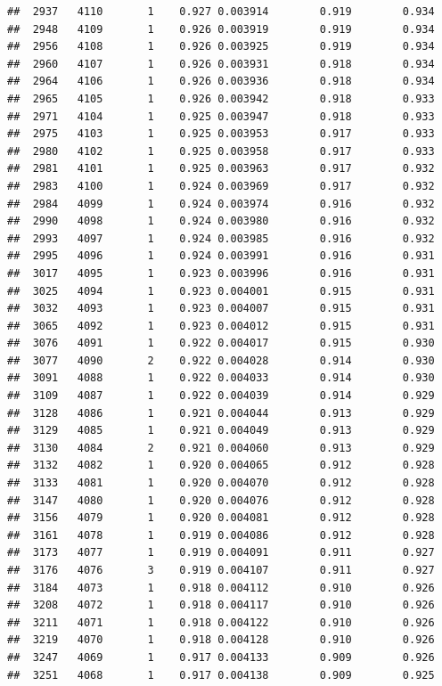 \documentclass[
]{book}
\begin{document}
\begin{verbatim}
##  2937   4110       1    0.927 0.003914        0.919        0.934
##  2948   4109       1    0.926 0.003919        0.919        0.934
##  2956   4108       1    0.926 0.003925        0.919        0.934
##  2960   4107       1    0.926 0.003931        0.918        0.934
##  2964   4106       1    0.926 0.003936        0.918        0.934
##  2965   4105       1    0.926 0.003942        0.918        0.933
##  2971   4104       1    0.925 0.003947        0.918        0.933
##  2975   4103       1    0.925 0.003953        0.917        0.933
##  2980   4102       1    0.925 0.003958        0.917        0.933
##  2981   4101       1    0.925 0.003963        0.917        0.932
##  2983   4100       1    0.924 0.003969        0.917        0.932
##  2984   4099       1    0.924 0.003974        0.916        0.932
##  2990   4098       1    0.924 0.003980        0.916        0.932
##  2993   4097       1    0.924 0.003985        0.916        0.932
##  2995   4096       1    0.924 0.003991        0.916        0.931
##  3017   4095       1    0.923 0.003996        0.916        0.931
##  3025   4094       1    0.923 0.004001        0.915        0.931
##  3032   4093       1    0.923 0.004007        0.915        0.931
##  3065   4092       1    0.923 0.004012        0.915        0.931
##  3076   4091       1    0.922 0.004017        0.915        0.930
##  3077   4090       2    0.922 0.004028        0.914        0.930
##  3091   4088       1    0.922 0.004033        0.914        0.930
##  3109   4087       1    0.922 0.004039        0.914        0.929
##  3128   4086       1    0.921 0.004044        0.913        0.929
##  3129   4085       1    0.921 0.004049        0.913        0.929
##  3130   4084       2    0.921 0.004060        0.913        0.929
##  3132   4082       1    0.920 0.004065        0.912        0.928
##  3133   4081       1    0.920 0.004070        0.912        0.928
##  3147   4080       1    0.920 0.004076        0.912        0.928
##  3156   4079       1    0.920 0.004081        0.912        0.928
##  3161   4078       1    0.919 0.004086        0.912        0.928
##  3173   4077       1    0.919 0.004091        0.911        0.927
##  3176   4076       3    0.919 0.004107        0.911        0.927
##  3184   4073       1    0.918 0.004112        0.910        0.926
##  3208   4072       1    0.918 0.004117        0.910        0.926
##  3211   4071       1    0.918 0.004122        0.910        0.926
##  3219   4070       1    0.918 0.004128        0.910        0.926
##  3247   4069       1    0.917 0.004133        0.909        0.926
##  3251   4068       1    0.917 0.004138        0.909        0.925

\end{verbatim}
\end{document}
